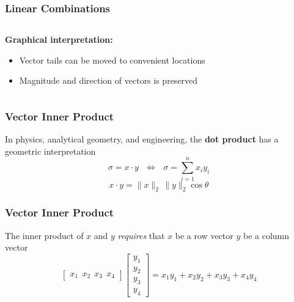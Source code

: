 \documentclass[10pt]{beamer}
\begin{document}
\begin{frame}
\frametitle{Linear Combinations}

\begin{columns}
\begin{column}{0.35\textwidth}
\textbf{Graphical interpretation:}
\begin{itemize}
    \item   Vector tails can be moved to convenient locations
    \item   Magnitude and direction of vectors is preserved
\end{itemize}
\end{column}
\begin{column}{0.55\textwidth}
\begin{center}
\end{center}
\end{column}
\end{columns}

\end{frame}
\begin{frame}
\frametitle{Vector Inner Product}

In physics, analytical geometry, and engineering, the
\textbf{dot product} has a geometric interpretation
\begin{equation*}
    \sigma = x \cdot y\ \ \ \Longleftrightarrow\ \ \
    \sigma = \sum_{i = 1}^{n}{x_i y_i}
\end{equation*}
\begin{equation*}
    x\cdot y = \|x\|_{2}\, \|y\|_{2} \cos\theta
\end{equation*}

\end{frame}
\begin{frame}
\frametitle{Vector Inner Product}

The inner product of $x$ and $y$ \emph{requires} that
$x$ be a row vector
$y$ be a column vector
\begin{equation*}
    \begin{bmatrix}x_1\ \ x_2\ \ x_3\ \ x_4\end{bmatrix}
    \begin{bmatrix}y_1\\  y_2\\  y_3\\  y_4\end{bmatrix}
    = x_1 y_1 + x_2 y_2 + x_3 y_3 + x_4 y_4
\end{equation*}

\end{frame}
\end{document}
